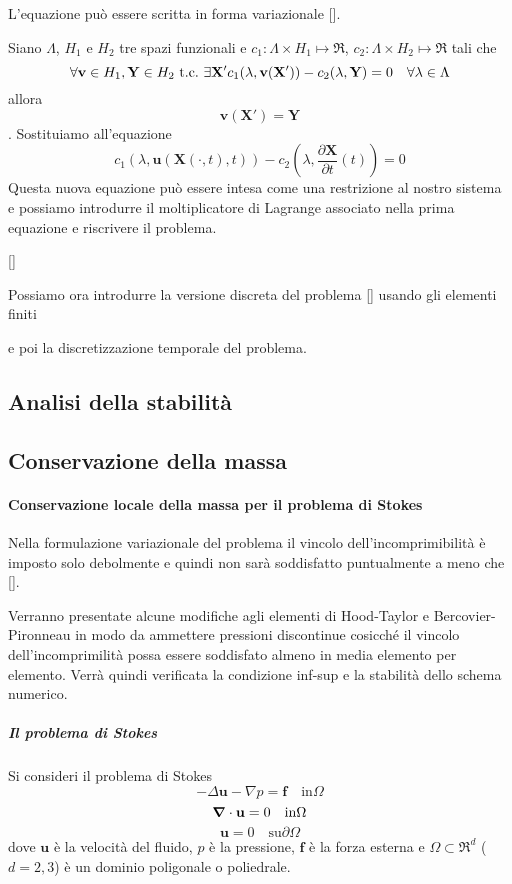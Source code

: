 L'equazione può essere scritta in forma variazionale [].

Siano $\Lambda$, $H_1$ e $H_2$ tre spazi funzionali e $c_1:\Lambda\times H_1\mapsto\Re$, $c_2:\Lambda\times H_2\mapsto\Re$ tali che
$$\forall\mathbf{v}\in H_1,\mathbf{Y}\in H_2\ \text{t.c.}\ \exists\mathbf{X'} c_1(\lambda,\mathbf{v}(\mathbf{X'}))-c_2(\lambda,\mathbf{Y})=0 \quad\forall\lambda\in\Lambda$$
allora $$\mathbf{v}(\mathbf{X'})=\mathbf{Y}$$.
Sostituiamo all'equazione
$$c_1(\lambda,\mathbf{u}(\mathbf{X}(\cdot,t),t))-c_2(\lambda,\frac{\partial\mathbf{X}}{\partial t}(t))=0$$
Questa nuova equazione può essere intesa come una restrizione al nostro sistema e possiamo introdurre il moltiplicatore di Lagrange associato nella prima equazione e riscrivere il problema.

[]

Possiamo ora introdurre la versione discreta del problema [] usando gli elementi finiti

e poi la discretizzazione temporale del problema.

\subsection{Analisi della stabilità }


\subsection{Conservazione della massa}

\paragraph{Conservazione locale della massa per il problema di Stokes}
Nella formulazione variazionale del problema il vincolo dell'incomprimibilità è imposto solo debolmente e quindi non sarà soddisfatto puntualmente a meno che [].

Verranno presentate alcune modifiche agli elementi di Hood-Taylor e Bercovier-Pironneau in modo da ammettere pressioni discontinue cosicché il vincolo dell'incomprimilità possa essere soddisfato almeno in media elemento per elemento. Verrà quindi verificata la condizione inf-sup e la stabilità dello schema numerico.

\subparagraph{Il problema di Stokes}
Si consideri il problema di Stokes
$$-\Delta\mathbf{u}-\nabla p=\mathbf{f}\quad\text{in}\Omega$$
$$\boldsymbol{\nabla}\cdot\mathbf{u}=0\quad\text{in}\Omega$$
$$\mathbf{u}=0\quad\text{su}\partial\Omega$$
dove $\mathbf{u}$ è la velocità del fluido, $p$ è la pressione, $\mathbf{f}$ è la forza esterna e $\Omega\subset\Re^d$ ($d=2,3$) è un dominio poligonale o poliedrale.

